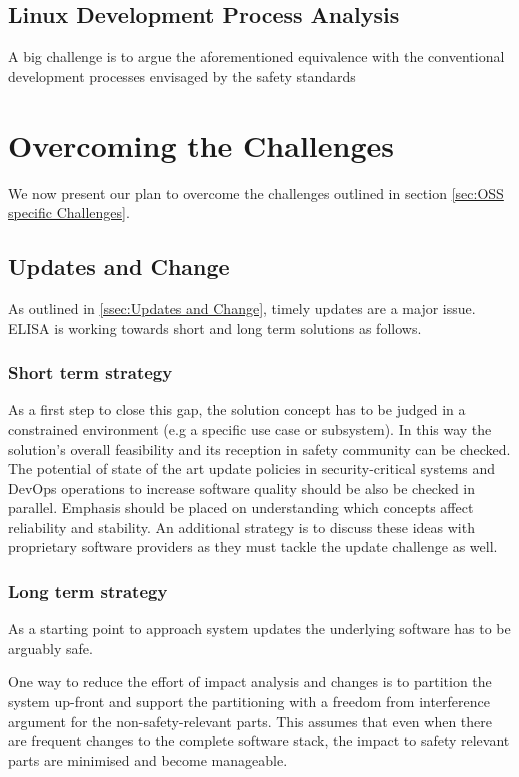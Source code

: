 \documentclass[12pt]{../Common_files/ElisaPaper}
\begin{document}
\subsection{Linux Development Process Analysis}
A big challenge is to argue the aforementioned equivalence with the conventional development processes envisaged by the safety standards 


\section{Overcoming the Challenges}
We now present our plan to overcome the challenges outlined in section \ref{sec:OSS specific Challenges}.

\subsection{Updates and Change}
As outlined in \ref{ssec:Updates and Change}, timely updates are a major issue.
ELISA is working towards short and long term solutions as follows.

\subsubsection{Short term strategy}
As a first step to close this gap, 
the solution concept has to be judged in a constrained environment (e.g a specific use case or subsystem).
In this way the solution's overall feasibility and its reception in safety community can be checked.
The potential of state of the art update policies in security-critical systems and DevOps operations 
to increase software quality 
should be also be checked in parallel.
Emphasis should be placed on understanding which concepts affect reliability and stability.
An additional strategy is to discuss these ideas with proprietary software providers
as they must tackle the update challenge as well.

\subsubsection{Long term strategy}
As a starting point to approach system updates 
the underlying software has to be arguably safe.

One way to reduce the effort of impact analysis and changes 
is to partition the system up-front and support the partitioning with a freedom from interference argument for the non-safety-relevant parts.
This assumes that even 
when there are frequent changes to the complete software stack, 
the impact to safety relevant parts are minimised and become manageable. 
\end{document}
